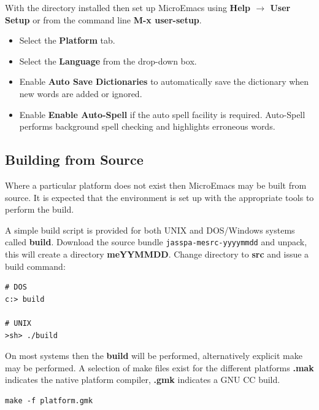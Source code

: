\documentclass[11pt,a4paper,pdftex]{article}
\begin{document}
    With the directory installed then set up MicroEmacs using \textbf{Help
    $\rightarrow$ User Setup} or from the command line \textbf{M-x
    user-setup}.

    \begin{itemize}
        \item Select the \textbf{Platform} tab.

        \item Select the \textbf{Language} from the drop-down box.

        \item Enable \textbf{Auto Save Dictionaries} to automatically save the dictionary
        when new words are added or ignored.

        \item Enable \textbf{Enable Auto-Spell} if the auto spell facility is
        required. Auto-Spell performs background spell checking and highlights
        erroneous words.

    \end{itemize}

\subsection{Building from Source}

    Where a particular platform does not exist then MicroEmacs may be built
    from source. It is expected that the environment is set up with the
    appropriate tools to perform the build.

    A simple build script is provided for both UNIX and DOS/Windows systems
    called \textbf{build}. Download the source bundle
    \texttt{jasspa-mesrc-yyyymmdd} and unpack, this will create a directory
    \textbf{meYYMMDD}. Change directory to \textbf{src} and issue a build
    command:

\begin{verbatim}
# DOS
c:> build

# UNIX
>sh> ./build
\end{verbatim}

    On most systems then the \textbf{build} will be performed, alternatively
    explicit make may be performed. A selection of make files exist for the
    different platforms \textbf{.mak} indicates the native platform compiler,
    \textbf{.gmk} indicates a GNU CC build.

\begin{verbatim}
make -f platform.gmk
\end{verbatim}
\end{document}

